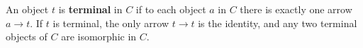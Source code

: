 An object $t$ is \textbf{terminal} in $C$ if to each object $a$ in $C$ there is exactly one arrow $a \rightarrow t$. If $t$ is terminal, the only arrow $t \rightarrow t$ is the identity, and any two terminal objects of $C$ are isomorphic in $C$.